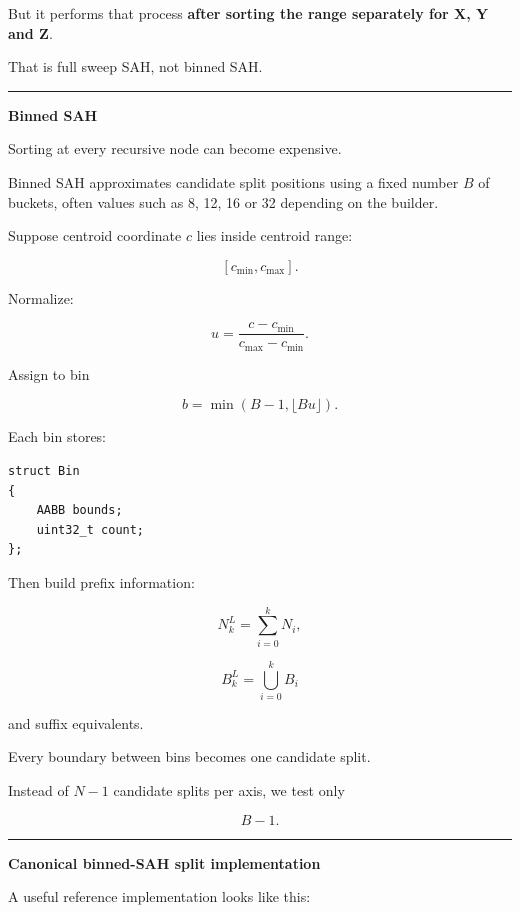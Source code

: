 But it performs that process \textbf{after sorting the range separately for X, Y and Z}.

That is full sweep SAH, not binned SAH.

\begin{center}\rule{0.5\linewidth}{0.5pt}\end{center}

\textbf{Binned SAH}

Sorting at every recursive node can become expensive.

Binned SAH approximates candidate split positions using a fixed number \(B\) of buckets, often values such as 8, 12, 16 or 32 depending on the builder.

Suppose centroid coordinate \(c\) lies inside centroid range:

\[
[c_{\min},c_{\max}].
\]

Normalize:

\[
u=
\frac{c-c_{\min}}
{c_{\max}-c_{\min}}.
\]

Assign to bin

\[
b=
\min(
B-1,
\lfloor Bu\rfloor
).
\]

Each bin stores:

\begin{verbatim}
struct Bin
{
    AABB bounds;
    uint32_t count;
};
\end{verbatim}

Then build prefix information:

\[
N^L_k
=
\sum_{i=0}^{k}N_i,
\]

\[
B^L_k
=
\bigcup_{i=0}^{k}B_i
\]

and suffix equivalents.

Every boundary between bins becomes one candidate split.

Instead of \(N-1\) candidate splits per axis, we test only

\[
B-1.
\]

\begin{center}\rule{0.5\linewidth}{0.5pt}\end{center}

\textbf{Canonical binned-SAH split implementation}

A useful reference implementation looks like this:

